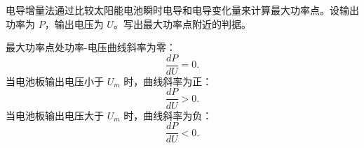 \begin{problem}[电导增量法最大功率点判据]\label{exer:calc_04_solar_p172_01}
电导增量法通过比较太阳能电池瞬时电导和电导变化量来计算最大功率点。设输出功率为 \(P\)，输出电压为 \(U\)。写出最大功率点附近的判据。
\end{problem}

\begin{solution}
最大功率点处功率-电压曲线斜率为零：
\begin{equation}
\frac{dP}{dU} = 0.
\end{equation}
当电池板输出电压小于 \(U_m\) 时，曲线斜率为正：
\begin{equation}
\frac{dP}{dU} > 0.
\end{equation}
当电池板输出电压大于 \(U_m\) 时，曲线斜率为负：
\begin{equation}
\frac{dP}{dU} < 0.
\end{equation}
\end{solution}
